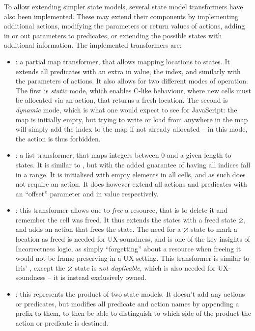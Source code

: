 To allow extending simpler state models, several state model transformers have also been implemented. These may extend their components by implementing additional actions, modifying the parameters or return values of actions, adding in or out parameters to predicates, or extending the possible states with additional information. The implemented transformers are: \begin{itemize}
	\item {}: a partial map transformer, that allows mapping locations to states. It extends all predicates with an extra in value, the index, and similarly with the parameters of actions. It also allows for two different modes of operation. The first is \emph{static} mode, which enables C-like behaviour, where new cells must be allocated via an  action, that returns a fresh location. The second is \emph{dynamic} mode, which is what one would expect to see for JavaScript: the map is initially empty, but trying to write or load from anywhere in the map will simply add the index to the map if not already allocated -- in this mode, the  action is thus forbidden.
	\item {}: a list transformer, that maps integers between $0$ and a given length to states. It is similar to , but with the added guarantee of having all indices fall in a range. It is initialised with empty elements in all cells, and as such does not require an  action. It does however extend all actions and predicates with an ``offset'' parameter and in value respectively.
	\item {}: this transformer allows one to \emph{free} a resource, that is to delete it and remember the cell was freed. It thus extends the states with a freed state $\varnothing$, and adds an action  that frees the state. The need for a $\varnothing$ state to mark a location as freed is needed for UX-soundness, and is one of the key insights of Incorrectness logic\cite{incorrectnesslogic}, as simply ``forgetting'' about a resource when freeing it would not be frame preserving in a UX setting. This transformer is similar to Iris' , except the $\varnothing$ state is \emph{not duplicable}, which is also needed for UX-soundness -- it is instead exclusively owned.
	\item {}: this represents the product of two state models. It doesn't add any actions or predicates, but modifies all predicate and action names by appending a prefix to them, to then be able to distinguish to which side of the product the action or predicate is destined.
\end{itemize}

